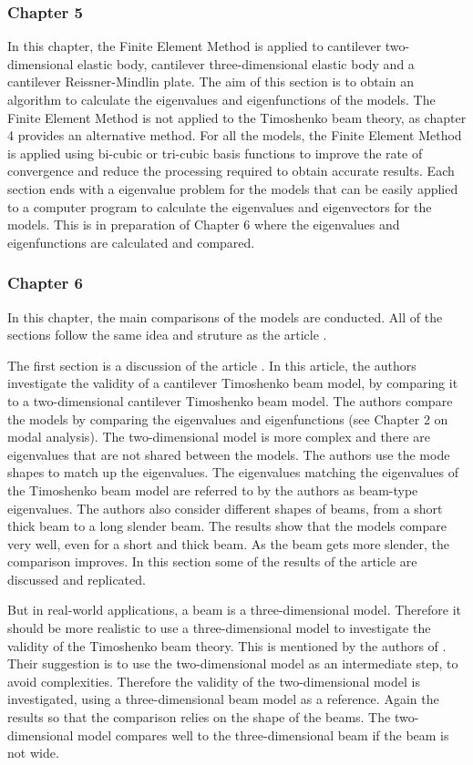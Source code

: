 \documentclass[../main.tex]{subfiles}
\begin{document}
\subsubsection{Chapter 5}
In this chapter, the Finite Element Method is applied to cantilever two-dimensional elastic body, cantilever three-dimensional elastic body and a cantilever Reissner-Mindlin plate. The aim of this section is to obtain an algorithm to calculate the eigenvalues and eigenfunctions of the models. The Finite Element Method is not applied to the Timoshenko beam theory, as chapter 4 provides an alternative method. For all the models, the Finite Element Method is applied using bi-cubic or tri-cubic basis functions to improve the rate of convergence and reduce the processing required to obtain accurate results. Each section ends with a eigenvalue problem for the models that can be easily applied to a computer program to calculate the eigenvalues and eigenvectors for the models. This is in preparation of Chapter 6 where the eigenvalues and eigenfunctions are calculated and compared.

\subsubsection{Chapter 6}
In this chapter, the main comparisons of the models are conducted. All of the sections follow the same idea and struture as the article \cite{LVV09}.

The first section is a discussion of the article \cite{LVV09}. In this article, the authors investigate the validity of a cantilever Timoshenko beam model, by comparing it to a two-dimensional cantilever Timoshenko beam model. The authors compare the models by comparing the eigenvalues and eigenfunctions (see Chapter 2 on modal analysis). The two-dimensional model is more complex and there are eigenvalues that are not shared between the models. The authors use the mode shapes to match up the eigenvalues. The eigenvalues matching the eigenvalues of the Timoshenko beam model are referred to by the authors as beam-type eigenvalues. The authors also consider different shapes of beams, from a short thick beam to a long slender beam. The results show that the models compare very well, even for a short and thick beam. As the beam gets more slender, the comparison improves. In this section some of the results of the article are discussed and replicated.

But in real-world applications, a beam is a three-dimensional model. Therefore it should be more realistic to use a three-dimensional model to investigate the validity of the Timoshenko beam theory. This is mentioned by the authors of \cite{LVV09}. Their suggestion is to use the two-dimensional model as an intermediate step, to avoid complexities. Therefore the validity of the two-dimensional model is investigated, using a three-dimensional beam model as a reference. Again the results so that the comparison relies on the shape of the beams. The two-dimensional model compares well to the three-dimensional beam if the beam is not wide. 
\end{document}
